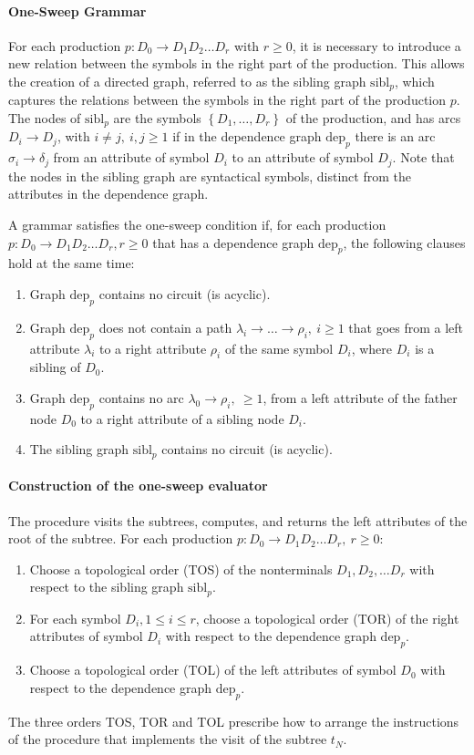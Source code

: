 \paragraph*{One-Sweep Grammar}
For each production $p: D_0 \rightarrow D_1 D_2 \ldots D_r$ with $r \geq 0$, it is necessary to introduce a new relation between the symbols in the right part of the production.
This allows the creation of a directed graph, referred to as the sibling graph $\text{sibl}_p$, which captures the relations between the symbols in the right part of the production $p$.
The nodes of $\text{sibl}_p$ are the symbols $\left\{ D_1, \ldots , D_r \right\}$ of the production, and has arcs $D_i \rightarrow D_j$, with $i \neq j, \ i,j \geq 1$ if in the dependence graph $\text{dep}_p$ there is an arc $\sigma_i \rightarrow \delta_j$ from an attribute of symbol $D_i$ to an attribute of symbol $D_j$.
Note that the nodes in the sibling graph are syntactical symbols, distinct from the attributes in the dependence graph.

A grammar satisfies the one-sweep condition if, for each production $p : D_0 \rightarrow D_1 D_2 \ldots D_r,  r \geq 0$ that has a dependence graph $\text{dep}_p$, the following clauses hold at the same time:
\begin{enumerate}
    \item Graph $\text{dep}_p$ contains no circuit (is acyclic).
    \item Graph $\text{dep}_p$ does not contain a path $\lambda_i \rightarrow \ldots \rightarrow \rho_i, \ i \geq 1$ that goes from a left attribute $\lambda_i$ to a right attribute $\rho_i$ of the same symbol $D_i$, where $D_i$ is a sibling of $D_0$.
    \item Graph $\text{dep}_p$ contains no arc $\lambda_0 \rightarrow \rho_i, \ \geq 1$, from a left attribute of the father node $D_0$ to a right attribute of a sibling node $D_i$.
    \item The sibling graph $\text{sibl}_p$ contains no circuit (is acyclic).
\end{enumerate}

\paragraph*{Construction of the one-sweep evaluator}
The procedure visits the subtrees, computes, and returns the left attributes of the root of the subtree.
For each production $p : D_0 \rightarrow D_1 D_2 \ldots D_r, \ r \geq 0$:
\begin{enumerate}
    \item Choose a topological order (TOS) of the nonterminals $D_1, D_2, \ldots  D_r$ with respect to the sibling graph $\text{sibl}_p$.
    \item For each symbol $D_i,  1 \leq i \leq r$, choose a topological order (TOR) of the right attributes of symbol $D_i$ with respect to the dependence graph $\text{dep}_p$.
    \item Choose a topological order (TOL) of the left attributes of symbol $D_0$ with respect to the dependence graph $\text{dep}_p$.
\end{enumerate}
The three orders TOS, TOR and TOL prescribe how to arrange the instructions of the procedure that implements the visit of the subtree $t_N$.

